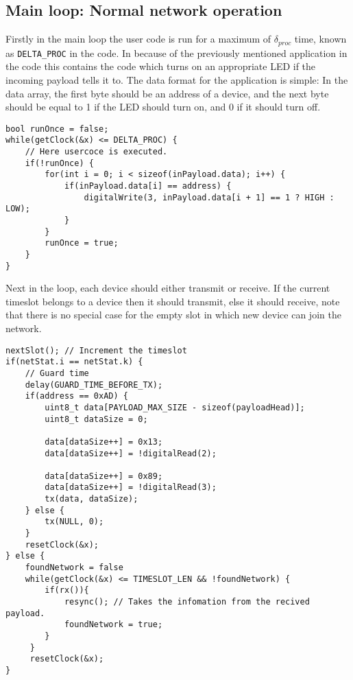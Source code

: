 \subsection{Main loop: Normal network operation}
Firstly in the main loop the user code is run for a maximum of $\delta_{proc}$ time, known as \texttt{DELTA\_PROC} in the code.
In because of the previously mentioned application in the code this contains the code which turns on an appropriate LED if the incoming payload tells it to. 
The data format for the application is simple: In the data array, the first byte should be an address of a device, and the next byte should be equal to 1 if the LED should turn on, and 0 if it should turn off. 

\begin{lstlisting}[style=customc,caption={The usercode for the application. },label={lst:ccrc:usercode}]
bool runOnce = false;
while(getClock(&x) <= DELTA_PROC) {
    // Here usercoce is executed.
    if(!runOnce) {
        for(int i = 0; i < sizeof(inPayload.data); i++) {
            if(inPayload.data[i] == address) {
                digitalWrite(3, inPayload.data[i + 1] == 1 ? HIGH : LOW);
            } 
        }
        runOnce = true;
    }
}
\end{lstlisting}

Next in the loop, each device should either transmit or receive. 
If the current timeslot belongs to a device then it should transmit, else it should receive, note that there is no special case for the empty slot in which new device can join the network. 

\begin{lstlisting}[style=customc,caption={The usercode for the application. },label={lst:ccrc:rxortx}]
nextSlot(); // Increment the timeslot
if(netStat.i == netStat.k) {
    // Guard time
    delay(GUARD_TIME_BEFORE_TX);
    if(address == 0xAD) { 
        uint8_t data[PAYLOAD_MAX_SIZE - sizeof(payloadHead)];
        uint8_t dataSize = 0;
        
        data[dataSize++] = 0x13;
        data[dataSize++] = !digitalRead(2);

        data[dataSize++] = 0x89;
        data[dataSize++] = !digitalRead(3);
        tx(data, dataSize);
    } else {
        tx(NULL, 0);
    }
    resetClock(&x);
} else {
    foundNetwork = false
    while(getClock(&x) <= TIMESLOT_LEN && !foundNetwork) {
        if(rx()){
            resync(); // Takes the infomation from the recived payload.
            foundNetwork = true;
        }
     }
     resetClock(&x);
}
\end{lstlisting}

